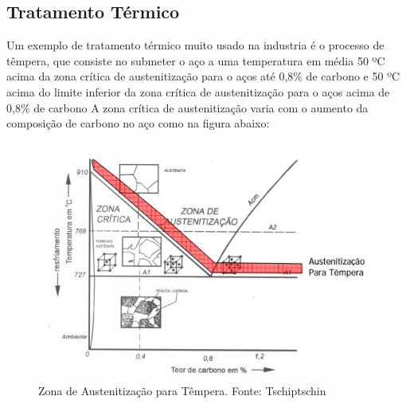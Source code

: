 \subsection{Tratamento Térmico}

Um exemplo de tratamento térmico muito usado na industria é o processo de têmpera, que consiste no submeter o aço a uma temperatura em média 50 ºC acima da zona crítica de austenitização para o aços até 0,8\% de carbono e 50 ºC acima do limite inferior da zona crítica de austenitização para o aços acima de 0,8\% de carbono A zona crítica de austenitização varia com o aumento da composição de carbono no aço como na figura abaixo:
\begin{figure}[!h]
	\centering
	\label{austenitizacao}
	\includegraphics[keepaspectratio=true,scale=0.8]{figuras/austenitizacao.JPG}
	\caption{Zona de Austenitização para Têmpera. Fonte: Tschiptschin}
\end{figure}

